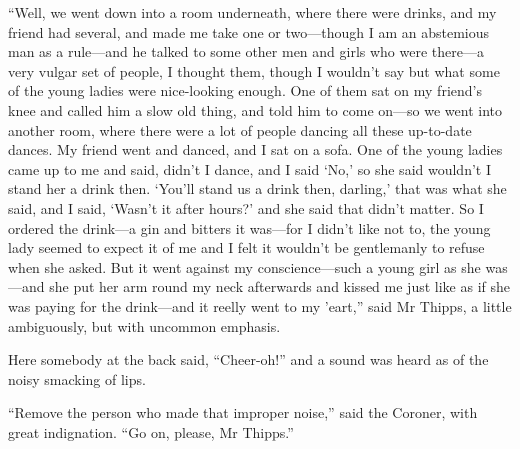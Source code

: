 \enquote{Well, we went down into a room underneath, where there were drinks, and my friend had several, and made me take one or two\allowbreak---\allowbreak though I am an abstemious man as a rule\allowbreak---\allowbreak and he talked to some other men and girls who were there\allowbreak---\allowbreak a very vulgar set of people, I thought them, though I wouldn’t say but what some of the young ladies were nice-looking enough. One of them sat on my friend’s knee and called him a slow old thing, and told him to come on\allowbreak---\allowbreak so we went into another room, where there were a lot of people dancing all these up-to-date dances. My friend went and danced, and I sat on a sofa. One of the young ladies came up to me and said, didn’t I dance, and I said \enquote{No,} so she said wouldn’t I stand her a drink then. \enquote{You’ll stand us a drink then, darling,} that was what she said, and I said, \enquote{Wasn’t it after hours?} and she said that didn’t matter. So I ordered the drink\allowbreak---\allowbreak a gin and bitters it was\allowbreak---\allowbreak for I didn’t like not to, the young lady seemed to expect it of me and I felt it wouldn’t be gentlemanly to refuse when she asked. But it went against my conscience\allowbreak---\allowbreak such a young girl as she was\allowbreak---\allowbreak and she put her arm round my neck afterwards and kissed me just like as if she was paying for the drink\allowbreak---\allowbreak and it reelly went to my ’eart,} said Mr Thipps, a little ambiguously, but with uncommon emphasis.

Here somebody at the back said, \enquote{Cheer-oh!} and a sound was heard as of the noisy smacking of lips.

\enquote{Remove the person who made that improper noise,} said the Coroner, with great indignation. \enquote{Go on, please, Mr Thipps.}

